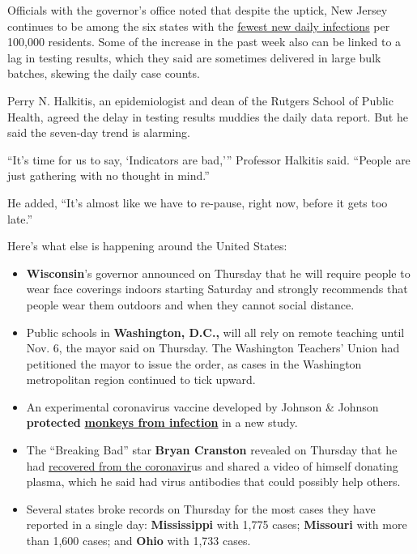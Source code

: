 Officials with the governor's office noted that despite the uptick, New
Jersey continues to be among the six states with the
\href{https://www.nytimes3xbfgragh.onion/interactive/2020/us/coronavirus-us-cases.html\#states}{fewest
new daily infections} per 100,000 residents. Some of the increase in the
past week also can be linked to a lag in testing results, which they
said are sometimes delivered in large bulk batches, skewing the daily
case counts.

Perry N. Halkitis, an epidemiologist and dean of the Rutgers School of
Public Health, agreed the delay in testing results muddies the daily
data report. But he said the seven-day trend is alarming.

``It's time for us to say, `Indicators are bad,''' Professor Halkitis
said. ``People are just gathering with no thought in mind.''

He added, ``It's almost like we have to re-pause, right now, before it
gets too late.''

Here's what else is happening around the United States:

\begin{itemize}
\item
  \textbf{Wisconsin}'s governor announced on Thursday that he will
  require people to wear face coverings indoors starting Saturday and
  strongly recommends that people wear them outdoors and when they
  cannot social distance.
\item
  Public schools in \textbf{Washington, D.C.,} will all rely on remote
  teaching until Nov. 6, the mayor said on Thursday. The Washington
  Teachers' Union had petitioned the mayor to issue the order, as cases
  in the Washington metropolitan region continued to tick upward.
\end{itemize}

\begin{itemize}
\item
  An experimental coronavirus vaccine developed by Johnson \& Johnson
  \textbf{protected}
  \textbf{\href{https://www.nytimes3xbfgragh.onion/2020/07/30/health/covid-19-vaccine-monkeys.html}{monkeys
  from infection}} in a new study.
\item
  The ``Breaking Bad'' star \textbf{Bryan Cranston} revealed on Thursday
  that he had
  \href{https://www.nytimes3xbfgragh.onion/2020/07/31/arts/television/bryan-cranston-coronavirus-plasma.html}{recovered
  from the coronavir}us and shared a video of himself donating plasma,
  which he said had virus antibodies that could possibly help others.
\item
  Several states broke records on Thursday for the most cases they have
  reported in a single day: \textbf{Mississippi} with 1,775 cases;
  \textbf{Missouri} with more than 1,600 cases; and \textbf{Ohio} with
  1,733 cases.
\end{itemize}

